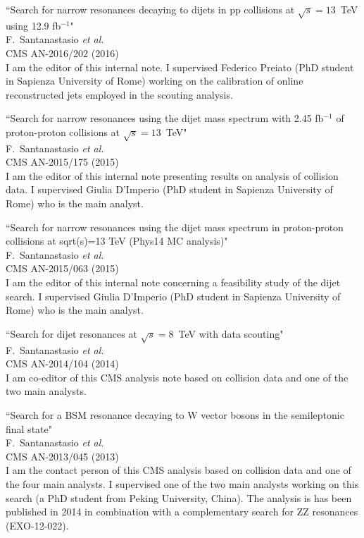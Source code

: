 \documentclass[10pt, a4paper]{article}
\begin{document}
\begin{thebibliography}{599}
``Search for narrow resonances decaying to dijets in pp collisions at $\sqrt{s}=13$~TeV using 12.9 fb$^{-1}$"
  \\{}F.~Santanastasio {\it et al.}
  \\{}CMS AN-2016/202 (2016)
  \\ I am the editor of this internal note. I supervised Federico Preiato (PhD student in Sapienza University of Rome)
  working on the calibration of online reconstructed jets employed in the scouting analysis.

``Search for narrow resonances using the dijet mass spectrum with 2.45 fb$^{-1}$ of proton-proton collisions at $\sqrt{s}=13$~TeV"
  \\{}F.~Santanastasio {\it et al.}
  \\{}CMS AN-2015/175 (2015)
  \\ I am the editor of this internal note presenting results on
  analysis of collision data. I supervised Giulia D'Imperio (PhD
  student in Sapienza University of Rome) who is the main analyst.

``Search for narrow resonances using the dijet mass spectrum in proton-proton collisions at sqrt(s)=13 TeV (Phys14 MC analysis)"
  \\{}F.~Santanastasio {\it et al.}
  \\{}CMS AN-2015/063 (2015)
  \\ I am the editor of this internal note concerning a feasibility study of
  the dijet search. I supervised Giulia D'Imperio (PhD student in Sapienza University of Rome) who is
  the main analyst.

``Search for dijet resonances at $\sqrt{s}=8$~TeV with data scouting"
  \\{}F.~Santanastasio {\it et al.}
  \\{}CMS AN-2014/104 (2014)
  \\ I am co-editor of this CMS analysis note based on collision data and one of the two main analysts. 

``Search for a BSM resonance decaying to W vector bosons in the semileptonic final state"
  \\{}F.~Santanastasio {\it et al.}
  \\{}CMS AN-2013/045 (2013)
  \\ I am the contact person of this CMS analysis based on collision data and one of the four main analysts. I supervised one of the two main analysts working on this search (a PhD student from Peking University, China). The analysis is has been published in 2014 in combination with a complementary search for ZZ resonances (EXO-12-022).


\end{thebibliography}
\end{document}
